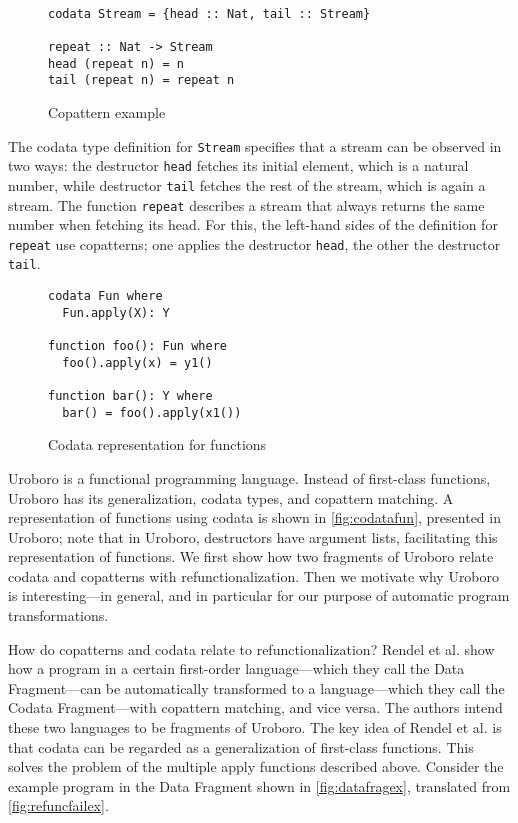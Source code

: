 \begin{figure}
\begin{lstlisting}

codata Stream = {head :: Nat, tail :: Stream}

repeat :: Nat -> Stream
head (repeat n) = n
tail (repeat n) = repeat n

\end{lstlisting}
\caption{Copattern example}
\label{fig:codataex}
\end{figure}

The codata type definition for \texttt{Stream} specifies that a stream can be observed in two ways: the destructor \texttt{head} fetches its initial element, which is a natural number, while destructor \texttt{tail} fetches the rest of the stream, which is again a stream. The function \texttt{repeat} describes a stream that always returns the same number when fetching its head. For this, the left-hand sides of the definition for \texttt{repeat} use copatterns; one applies the destructor \texttt{head}, the other the destructor \texttt{tail}.

\begin{figure}
\begin{lstlisting}
codata Fun where
  Fun.apply(X): Y

function foo(): Fun where
  foo().apply(x) = y1()

function bar(): Y where
  bar() = foo().apply(x1())
\end{lstlisting}
\caption{Codata representation for functions}
\label{fig:codatafun}
\end{figure}

Uroboro is a functional programming language. Instead of first-class functions, Uroboro has its generalization, codata types, and copattern matching. A representation of functions using codata is shown in \autoref{fig:codatafun}, presented in Uroboro; note that in Uroboro, destructors have argument lists, facilitating this representation of functions. We first show how two fragments of Uroboro relate codata and copatterns with refunctionalization. Then we motivate why Uroboro is interesting---in general, and in particular for our purpose of automatic program transformations.

How do copatterns and codata relate to refunctionalization? Rendel et al.\cite{rendel15automatic} show how a program in a certain first-order language---which they call the Data Fragment---can be automatically transformed to a language---which they call the Codata Fragment---with copattern matching, and vice versa. The authors intend these two languages to be fragments of Uroboro. The key idea of Rendel et al. is that codata can be regarded as a generalization of first-class functions. This solves the problem of the multiple apply functions described above. Consider the example program in the Data Fragment shown in \autoref{fig:datafragex}, translated from \autoref{fig:refuncfailex}.

